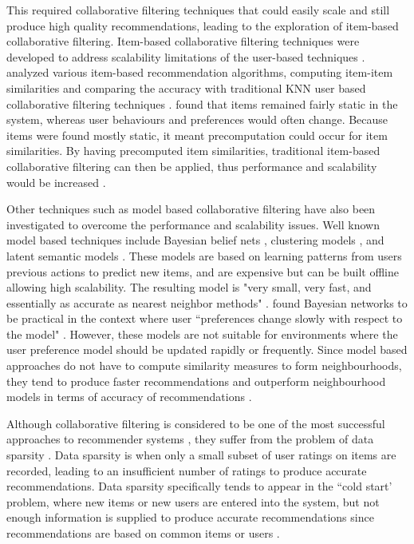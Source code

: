 This required collaborative filtering techniques that could easily scale and still produce high quality recommendations, leading to the exploration of item-based collaborative filtering. Item-based collaborative filtering techniques were developed to address scalability limitations of the user-based techniques \cite{survey}. \citeauthor{itembased} analyzed various item-based recommendation algorithms, computing item-item similarities and comparing the accuracy with traditional KNN user based collaborative filtering techniques \cite{itembased}. \citeauthor{itembased} found that items remained fairly static in the system, whereas user behaviours and preferences would often change. Because items were found mostly static, it meant precomputation could occur for item similarities. By having precomputed item similarities, traditional item-based collaborative filtering can then be applied, thus performance and scalability would be increased \cite{scalable}.

Other techniques such as model based collaborative filtering have also been investigated to overcome the performance and scalability issues. Well known model based techniques include Bayesian belief nets \cite{baysian}, clustering models \cite{clustering}, and latent semantic models \cite{latent}. These models are based on learning patterns from users previous actions to predict new items, and are expensive but can be built offline allowing high scalability. The resulting model is "very small, very fast, and essentially as accurate as nearest neighbor methods" \cite{itembased}. \citeauthor{itembased} found Bayesian networks to be practical in the context where user ``preferences change slowly with respect to the model" \cite{itembased}. However, these models are not suitable for environments where the user preference model should be updated rapidly or frequently. Since model based approaches do not have to compute similarity measures to form neighbourhoods, they tend to produce faster recommendations and outperform neighbourhood models in terms of accuracy of recommendations \cite{toward, itembased}. 

Although collaborative filtering is considered to be one of the most successful approaches to recommender systems \cite{survey, toward}, they suffer from the problem of data sparsity \cite{toward, survey, itembased, koren2009matrix, koren2011, dimension}. Data sparsity is when only a small subset of user ratings on items are recorded, leading to an insufficient number of ratings to produce accurate recommendations. Data sparsity specifically tends to appear in the ``cold start' problem, where new items or new users are entered into the system, but not enough information is supplied to produce accurate recommendations since recommendations are based on common items or users \cite{survey}.

